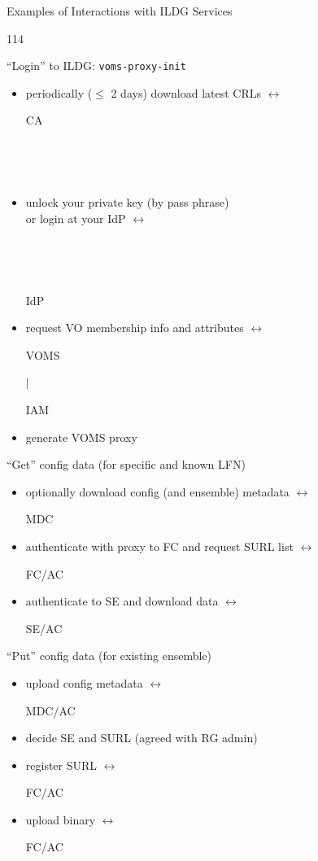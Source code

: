 \documentclass[aspectratio=169,xcolor=dvipsnames]{beamer}
\newcommand{\bi}{\begin{itemize}}
\newcommand{\ei}{\end{itemize}}
\begin{document}
\begin{frame}{Examples of Interactions with ILDG Services}

  \begin{dinglist}{114} \setlength{\itemsep}{2mm}
    \item ``Login'' to ILDG: {\tt voms-proxy-init}
      \bi
      \item periodically ($\le$ 2 days) download latest CRLs \hfill $\longleftrightarrow$ \parbox{4em}{CA}$~$ \parbox{4em}{~}
      \item unlock your private key (by pass phrase) \\[-1mm]
        or login at your IdP                                 \hfill $\longleftrightarrow$ \parbox{4em}{~}$~$ \parbox{4em}{IdP}
      \item request VO membership info and attributes        \hfill $\longleftrightarrow$ \parbox{4em}{VOMS}$\vert$ \parbox{4em}{IAM}
      \item generate VOMS proxy 
      \ei
    \item ``Get'' config data (for specific and known LFN)
      \bi
      \item optionally download config (and ensemble) metadata  \hfill $\longleftrightarrow$ \parbox{8em}{MDC}
      \item authenticate with proxy to FC and request SURL list \hfill $\longleftrightarrow$ \parbox{8em}{FC/AC}
      \item authenticate to SE and download data                \hfill $\longleftrightarrow$ \parbox{8em}{SE/AC}
      \ei
    \item ``Put'' config data (for existing ensemble)
      \bi
      \item upload config metadata                              \hfill $\longleftrightarrow$ \parbox{8em}{MDC/AC}
      \item decide SE and SURL (agreed with RG admin)
      \item register SURL                                       \hfill $\longleftrightarrow$ \parbox{8em}{FC/AC}
      \item upload binary                                       \hfill $\longleftrightarrow$ \parbox{8em}{FC/AC}
      \ei  
  \end{dinglist}
  \vfill
\end{frame}
\end{document}
